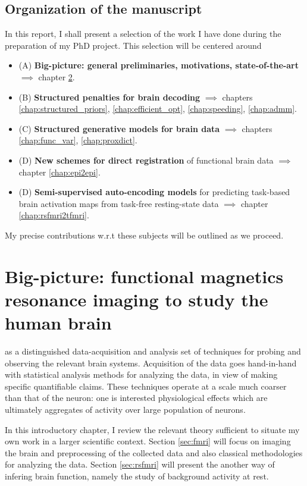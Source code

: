 \section{Organization of the manuscript}
In this report, I shall present a selection of the work I have done during the preparation of my PhD project. This selection will be centered around
\begin{itemize}
\item (A) \textbf{Big-picture: general preliminaries, motivations, state-of-the-art} $\implies$ chapter \ref{chap:bigpic}.
\item (B) \textbf{Structured penalties for brain decoding} $\implies$ chapters \ref{chap:structured_priors}, \ref{chap:efficient_opt}, \ref{chap:speeding}, \ref{chap:admm}.
\item (C) \textbf{Structured generative models for brain data} $\implies$ chapters \ref{chap:func_var}, \ref{chap:proxdict}.
\item (D) \textbf{New schemes for direct registration} of functional brain data $\implies$ chapter \ref{chap:epi2epi}.
\item (D) \textbf{Semi-supervised auto-encoding models} for predicting task-based brain activation
  maps from task-free resting-state data $\implies$ chapter \ref{chap:rsfmri2tfmri}.
\end{itemize}
My precise contributions w.r.t these subjects will be outlined  as we proceed.

\chapter{Big-picture: functional magnetics resonance imaging to study the human brain}\label{chap:bigpic}

\minitoc
 
 as a distinguished data-acquisition and analysis set of techniques for probing and observing the relevant brain systems.
Acquisition of the data goes hand-in-hand with
  statistical analysis methods for analyzing the data, in view of making specific quantifiable claims. These techniques operate at a scale much coarser than that of the neuron: one is interested physiological effects which are ultimately aggregates of activity over large population of neurons.

In this introductory chapter, I review the relevant theory sufficient to situate my own work in a larger scientific context. Section \ref{sec:fmri} will
focus on imaging the brain and preprocessing of the collected data and also classical methodologies for analyzing the data.
  Section \ref{sec:rsfmri} will present the another way of infering brain function,
  namely the study of background activity at rest.


